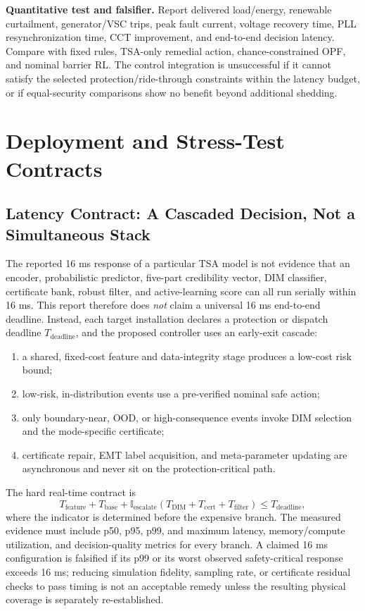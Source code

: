 \documentclass[conference]{IEEEtran}
\begin{document}
\textbf{Quantitative test and falsifier.} Report delivered load/energy, renewable curtailment, generator/VSC trips, peak fault current, voltage recovery time, PLL resynchronization time, CCT improvement, and end-to-end decision latency. Compare with fixed rules, TSA-only remedial action, chance-constrained OPF, and nominal barrier RL. The control integration is unsuccessful if it cannot satisfy the selected protection/ride-through constraints within the latency budget, or if equal-security comparisons show no benefit beyond additional shedding.

\section{Deployment and Stress-Test Contracts}

\subsection{Latency Contract: A Cascaded Decision, Not a Simultaneous Stack}

The reported 16 ms response of a particular TSA model \cite{zhu2020} is not evidence that an encoder, probabilistic predictor, five-part credibility vector, DIM classifier, certificate bank, robust filter, and active-learning score can all run serially within 16 ms. This report therefore does \emph{not} claim a universal 16 ms end-to-end deadline. Instead, each target installation declares a protection or dispatch deadline $T_{\mathrm{deadline}}$, and the proposed controller uses an early-exit cascade:
\begin{enumerate}
  \item a shared, fixed-cost feature and data-integrity stage produces a low-cost risk bound;
  \item low-risk, in-distribution events use a pre-verified nominal safe action;
  \item only boundary-near, OOD, or high-consequence events invoke DIM selection and the mode-specific certificate;
  \item certificate repair, EMT label acquisition, and meta-parameter updating are asynchronous and never sit on the protection-critical path.
\end{enumerate}
The hard real-time contract is
\begin{equation}
T_{\mathrm{feature}}+T_{\mathrm{base}}+
\mathbb{I}_{\mathrm{escalate}}(T_{\mathrm{DIM}}+T_{\mathrm{cert}}+T_{\mathrm{filter}})
\leq T_{\mathrm{deadline}},
\label{eq:latencycontract}
\end{equation}
where the indicator is determined before the expensive branch. The measured evidence must include p50, p95, p99, and maximum latency, memory/compute utilization, and decision-quality metrics for every branch. A claimed 16 ms configuration is falsified if its p99 or its worst observed safety-critical response exceeds 16 ms; reducing simulation fidelity, sampling rate, or certificate residual checks to pass timing is not an acceptable remedy unless the resulting physical coverage is separately re-established.
\end{document}
